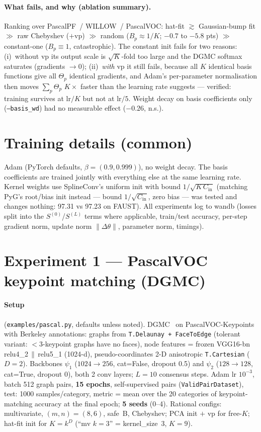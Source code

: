 \documentclass[11pt]{article}
\newcommand{\Cin}{C_{\mathrm{in}}}
\newcommand{\code}[1]{\texttt{#1}}
\begin{document}
\paragraph{What fails, and why (ablation summary).} Ranking over PascalPF~/
WILLOW~/ PascalVOC: hat-fit $\gtrsim$ Gaussian-bump fit $\gg$ raw Chebyshev
($+$vp) $\gg$ random ($B_p\!\approx\!1/K$; $-0.7$ to $-5.8$ pts) $\gg$
constant-one ($B_p\!\equiv\!1$, catastrophic). The constant init fails for
two reasons: (i)~without vp its output scale is $\sqrt{K}$-fold too large and
the DGMC softmax saturates (gradients $\to 0$); (ii)~\emph{with} vp it still
fails, because all $K$ identical basis functions give all $\Theta_p$
identical gradients, and Adam's per-parameter normalisation then moves
$\sum_p\Theta_p$ $K\times$ faster than the learning rate suggests ---
verified: training survives at $\mathrm{lr}/K$ but not at $\mathrm{lr}/5$.
Weight decay on basis coefficients only (\code{--basis\_wd}) had no
measurable effect ($-0.26$, n.s.).

\section{Training details (common)}
\label{sec:training}

Adam (PyTorch defaults, $\beta=(0.9,0.999)$), no weight decay. The basis
coefficients are trained jointly with everything else at the same learning
rate. Kernel weights use SplineConv's uniform init with bound
$1/\sqrt{K\,\Cin}$ (matching PyG's root/bias init instead --- bound
$1/\sqrt{\Cin}$, zero bias --- was tested and changes nothing: 97.31 vs
97.23 on FAUST). All experiments log to wandb (losses split into the
$S^{(0)}$/$S^{(L)}$ terms where applicable, train/test accuracy, per-step
gradient norm, update norm $\|\Delta\theta\|$, parameter norm, timings).

\section{Experiment 1 --- PascalVOC keypoint matching (DGMC)}
\label{sec:pascalvoc}

\paragraph{Setup} (\code{examples/pascal.py}, defaults unless noted).
DGMC~\cite{fey2020dgmc} on PascalVOC-Keypoints with Berkeley annotations:
graphs from \code{T.Delaunay + FaceToEdge} (tolerant variant:
$<3$-keypoint graphs have no faces), node features = frozen VGG16-bn
relu4\_2\,$\|$\,relu5\_1 (1024-d), pseudo-coordinates 2-D anisotropic
\code{T.Cartesian} ($D{=}2$). Backbones $\psi_1$ ($1024\to256$, cat=False,
dropout 0.5) and $\psi_2$ ($128\to128$, cat=True, dropout 0), both 2 conv
layers; $L{=}10$ consensus steps. Adam lr $10^{-3}$, batch 512 graph pairs,
\textbf{15 epochs}, self-supervised pairs (\code{ValidPairDataset}), test:
1000 samples/category, metric = mean over the 20 categories of
keypoint-matching accuracy at the final epoch; \textbf{5 seeds} (0--4).
Rational configs: multivariate, $(m,n)=(8,6)$, safe~B, Chebyshev; PCA init
$+$ vp for free-$K$; hat-fit init for $K=k^D$ (``mv $k{=}3$'' =
kernel\_size~3, $K{=}9$).
\end{document}
